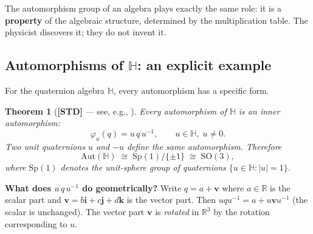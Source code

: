 \documentclass[12pt,a4paper]{article}
\newtheorem{theorem}{Theorem}[section]
\theoremstyle{definition}
\theoremstyle{remark}
\begin{document}
\begin{keybox}
  The automorphism group of an algebra plays exactly the same role:
  it is a \textbf{property} of the algebraic structure, determined by the
  multiplication table.  The physicist discovers it; they do not invent it.
\end{keybox}

\subsection{Automorphisms of $\mathbb{H}$: an explicit example}

For the quaternion algebra $\mathbb{H}$, every automorphism has a specific form.

\begin{theorem}[\textbf{[STD]} — see, e.g., \cite{adler1995}]
  \label{thm:aut_H}
  Every automorphism of $\mathbb{H}$ is an \emph{inner} automorphism:
  \[
    \varphi_u(q) = u\,q\,u^{-1},
    \qquad u\in\mathbb{H},\; u\neq 0.
  \]
  Two unit quaternions $u$ and $-u$ define the \emph{same} automorphism.
  Therefore
  \[
    \mathrm{Aut}(\mathbb{H})
    \;\cong\;
    \mathrm{Sp}(1)/\{\pm 1\}
    \;\cong\;
    \mathrm{SO}(3),
  \]
  where $\mathrm{Sp}(1)$ denotes the unit-sphere group of quaternions
  $\{u\in\mathbb{H} : |u|=1\}$.
\end{theorem}

\noindent\textbf{What does $u\,q\,u^{-1}$ do geometrically?}
Write $q = a + \mathbf{v}$ where $a\in\mathbb{R}$ is the scalar part and
$\mathbf{v} = b\mathbf{i}+c\mathbf{j}+d\mathbf{k}$ is the vector part.
Then $uqu^{-1} = a + u\mathbf{v}u^{-1}$ (the scalar is unchanged).  The
vector part $\mathbf{v}$ is \emph{rotated} in $\mathbb{R}^3$ by the rotation
corresponding to $u$.
\end{document}
